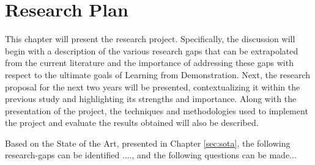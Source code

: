 \chapter{Research Plan}
This chapter will present the research project. Specifically, the discussion will begin with a description of the various research gaps that can be extrapolated from the current literature and the importance of addressing these gaps with respect to the ultimate goals of Learning from Demonstration. Next, the research proposal for the next two years will be presented, contextualizing it within the previous study and highlighting its strengths and importance. Along with the presentation of the project, the techniques and methodologies used to implement the project and evaluate the results obtained will also be described.



Based on the State of the Art, presented in Chapter \ref{sec:sota}, the following research-gaps can be identified ...., and the following questions can be made...